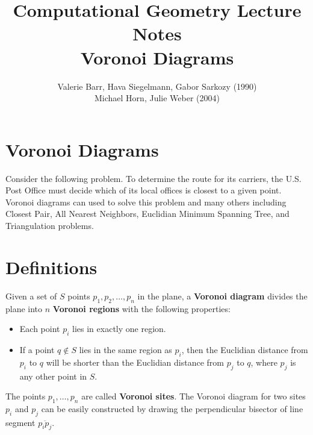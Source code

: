\documentclass[10pt]{article}
\begin{document}
\title {Computational Geometry Lecture Notes \\ Voronoi Diagrams}
\author{Valerie Barr, Hava Siegelmann, Gabor Sarkozy (1990) \\
        Michael Horn, Julie Weber (2004)}
\maketitle

\section{Voronoi Diagrams}
Consider the following problem.  To determine the route for its
carriers, the U.S. Post Office must decide which of its local offices
is closest to a given point. Voronoi diagrams can used to solve this
problem and many others including Closest Pair, All Nearest Neighbors,
Euclidian Minimum Spanning Tree, and Triangulation problems.

\begin{center}
\end{center}


\section{Definitions}

Given a set of $S$ points $p_1, p_2, \ldots, p_n$ in the plane, a {\bf
Voronoi diagram} divides the plane into $n$ {\bf Voronoi regions} with
the following properties:
\begin{itemize}
\item Each point $p_i$ lies in exactly one region.

\item If a point $q \notin S$ lies in the same region as $p_i$, then
the Euclidian distance from $p_i$ to $q$ will be shorter than the
Euclidian distance from $p_j$ to $q$, where $p_j$ is any other point
in $S$.
\end{itemize}

The points $p_1, \ldots, p_n$ are called {\bf Voronoi sites}.  The
Voronoi diagram for two sites $p_i$ and $p_j$ can be easily
constructed by drawing the perpendicular bisector of line segment
$\overline{p_i p_j}$.

\begin{center}
\end{center}
\end{document}
